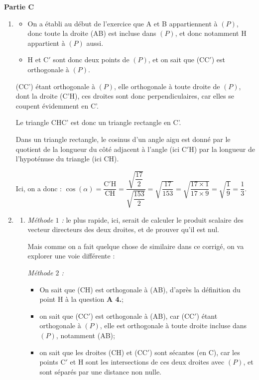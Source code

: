 \medskip

\textbf{Partie C}

\medskip

\begin{enumerate}
	\item \begin{itemize}[left=0mm]
		\item On a établi au début de l'exercice que A et B appartiennent à $(P)$, donc toute la droite (AB) est incluse dans $(P)$, et donc notamment H appartient à $(P)$ aussi.

		\item H et C$'$ sont donc deux points de $(P)$, et on sait que (CC$'$) est orthogonale à $(P)$.
	\end{itemize}

	(CC') étant orthogonale à $(P)$, elle orthogonale à toute droite de $(P)$, dont la droite (C'H), ces droites sont donc perpendiculaires, car elles se coupent évidemment en C'.

	Le triangle CHC' est donc un triangle rectangle en C'.

	Dans un triangle rectangle, le cosinus d'un angle aigu est donné par le quotient de la longueur du côté adjacent à l'angle (ici C$'$H) par la longueur de l'hypoténuse du triangle (ici CH).

	Ici, on a donc : \quad $\cos(\alpha ) = \dfrac{\mathrm{C'H}}{\mathrm{CH}} = \dfrac{\sqrt{\dfrac{17}{2}}}{\sqrt{\dfrac{153}{2}} } = \sqrt{\dfrac{17}{153}} = \sqrt{\dfrac{17\times 1}{17 \times 9}} = \sqrt{\dfrac{1}{9}} = \dfrac13$.

	\item \begin{enumerate}
		\item \emph{Méthode $1$ :} le plus rapide, ici, serait de calculer le produit scalaire des vecteur directeurs des deux droites, et de prouver qu'il est nul.

		\smallskip

Mais comme on a fait quelque chose de similaire dans ce corrigé, on va explorer une voie différente :


	\emph{Méthode $2$ :}
	\begin{itemize}[left=0mm]
		\item On sait que (CH) est orthogonale à (AB), d'après la définition du point H à la question \textbf{A 4.};
		\item on sait que (CC$'$) est orthogonale à (AB), car (CC$'$) étant orthogonale à $(P)$, elle est orthogonale à toute droite incluse dans $(P)$, notamment (AB);
		\item on sait que les droites (CH) et (CC$'$) sont sécantes (en C), car les points C$'$ et H sont les intersections de ces deux droites avec $(P)$, et sont séparés par une distance non nulle.
	\end{itemize}


\end{enumerate}
\end{enumerate}
